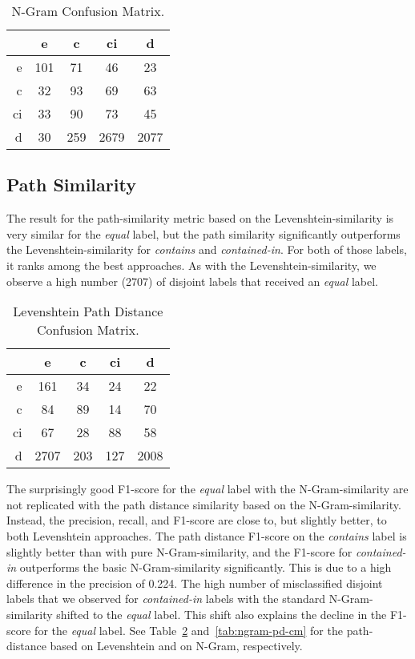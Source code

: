\begin{table}[htbp]
 \begin{center}
  \begin{tabular}{r|cccc}
   & e & c & ci & d \\
   \hline
   e & 101 & 71 & 46 & 23 \\
   c & 32 & 93 & 69 & 63 \\
   ci & 33 & 90 & 73 & 45 \\
   d & 30 & 259 & 2679 & 2077 \\
  \end{tabular}
  \caption{N-Gram Confusion Matrix.}
  \label{tab:ngram-cm}
 \end{center}
\end{table}

\subsection{Path Similarity}

The result for the path-similarity metric based on the Levenshtein-similarity is very similar for the \emph{equal} label, but
the path similarity significantly outperforms the Levenshtein-similarity for \emph{contains} and \emph{contained-in}.
For both of those labels, it ranks among the best approaches.
As with the Levenshtein-similarity, we observe a high number (2707) of disjoint labels that received an \emph{equal} label.

\begin{table}[htbp]
 \begin{center}
  \begin{tabular}{r|cccc}
   & e & c & ci & d \\
   \hline
   e & 161 & 34 & 24 & 22 \\
   c & 84 & 89 & 14 & 70 \\
   ci & 67 & 28 & 88 & 58 \\
   d & 2707 & 203 & 127 & 2008 \\
  \end{tabular}
  \caption{Levenshtein Path Distance Confusion Matrix.}
  \label{tab:levenshtein-pd-cm}
 \end{center}
\end{table}

The surprisingly good F1-score for the \emph{equal} label with the N-Gram-similarity are not replicated with the
path distance similarity based on  the N-Gram-similarity.
Instead, the precision, recall, and F1-score are close to, but slightly better, to both Levenshtein approaches.
The path distance F1-score on the \emph{contains} label is slightly better than with  pure N-Gram-similarity, and the F1-score
for \emph{contained-in} outperforms the basic N-Gram-similarity significantly.
This is due to a high difference in the precision of 0.224.
The high number of misclassified disjoint labels that we observed for \emph{contained-in} labels with the standard N-Gram-similarity
shifted to the \emph{equal} label.
This shift also explains the decline in the F1-score for the \emph{equal} label.
See Table~\ref{tab:levenshtein-pd-cm} and~\ref{tab:ngram-pd-cm} for the path-distance based on Levenshtein
and on N-Gram, respectively.

